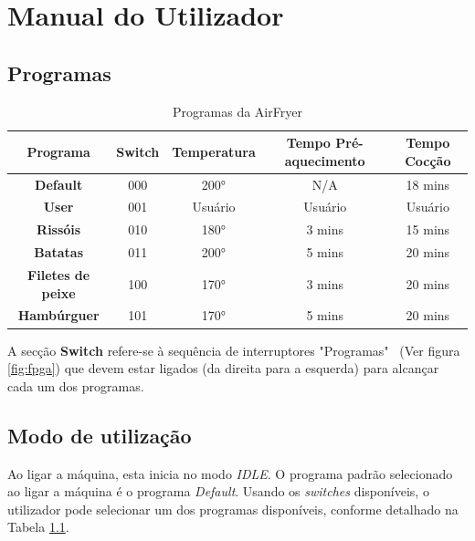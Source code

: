 \documentclass[a4paper, 11pt, onecolumn, oneside]{report}
\begin{document}
\chapter{Manual do Utilizador}
\label{chap.manualUtilizador}
\section{Programas}

\begin{table}[H]
\centering
\begin{tabular}{|c|c|c|c|c|}
\hline
\textbf{Programa} & \textbf{Switch} & \textbf{Temperatura} & \textbf{Tempo Pré-aquecimento} & \textbf{Tempo Cocção} \\ \hline
\textbf{Default}           & 000 & 200°    & N/A       & 18 mins    \\ \hline
\textbf{User}              & 001 & Usuário & Usuário   & Usuário    \\ \hline
\textbf{Rissóis}           & 010 & 180°    & 3 mins    & 15 mins    \\ \hline
\textbf{Batatas}           & 011 & 200°    & 5 mins    & 20 mins    \\ \hline
\textbf{Filetes de peixe}  & 100 & 170°    & 3 mins    & 20 mins    \\ \hline
\textbf{Hambúrguer}        & 101 & 170°    & 5 mins    & 20 mins    \\ \hline
\end{tabular}
\caption{Programas da AirFryer}
\label{tab:programas}
\end{table}
\par

A secção \textbf{Switch} refere-se à sequência de interruptores "Programas" \ (Ver figura \ref{fig:fpga}) que devem estar ligados (da direita para a esquerda) para alcançar cada um dos programas.

\section{Modo de utilização}
Ao ligar a máquina, esta inicia no modo \textit{IDLE}. O programa padrão selecionado ao ligar a máquina é o programa \textit{Default}. Usando os \textit{switches} disponíveis, o utilizador pode selecionar um dos programas disponíveis, conforme detalhado na Tabela \ref{tab:programas}.
\end{document}
